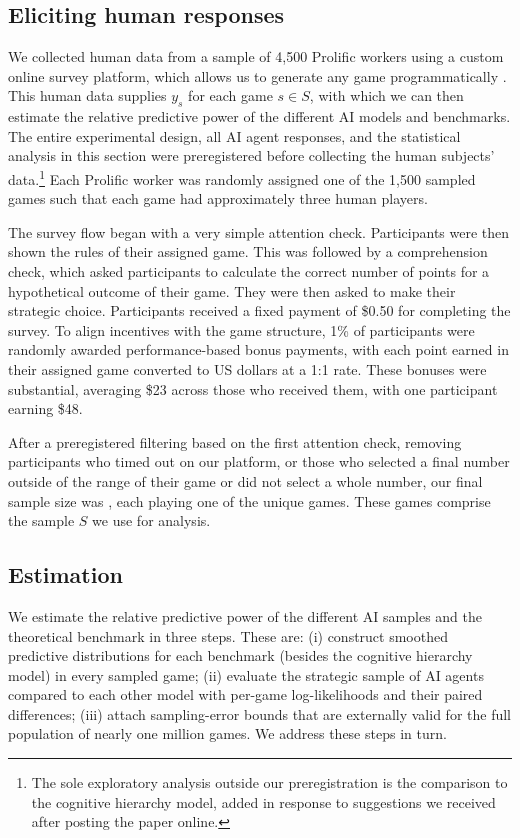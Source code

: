 \documentclass[11pt]{article}
\theoremstyle{definition}
\newcommand{\aisub}{AI agent}
\newcommand{\NGamesS}{1,500}
\newcommand{\NParticipantS}{4,500}
\begin{document}
\subsection{Eliciting human responses}

We collected human data from a sample of \NParticipantS{} Prolific workers using a custom online survey platform, which allows us to generate any game programmatically \citep{Horton2024EDSL}.
This human data supplies $y_{s}$ for each game $s \in S$, with which we can then estimate the relative predictive power of the different AI models and benchmarks.
The entire experimental design, all \aisub{} responses, and the statistical analysis in this section were preregistered before collecting the human subjects' data.\footnote{The sole exploratory analysis outside our preregistration is the comparison to the cognitive hierarchy model, added in response to suggestions we received after posting the paper online.}
Each Prolific worker was randomly assigned one of the \NGamesS{} sampled games such that each game had approximately three human players.

The survey flow began with a very simple attention check.
Participants were then shown the rules of their assigned game.
This was followed by a comprehension check, which asked participants to calculate the correct number of points for a hypothetical outcome of their game.
They were then asked to make their strategic choice.
Participants received a fixed payment of \$0.50 for completing the survey.
To align incentives with the game structure, 1\% of participants were randomly awarded performance-based bonus payments, with each point earned in their assigned game converted to US dollars at a 1:1 rate.
These bonuses were substantial, averaging \$23 across those who received them, with one participant earning \$48.

After a preregistered filtering based on the first attention check, removing participants who timed out on our platform, or those who selected a final number outside of the range of their game or did not select a whole number, our final sample size was \SampleSizeHuman{}, each playing one of the  \SampleSizeGame{} unique games.
These \SampleSizeGame{} games comprise the sample $S$ we use for analysis.

\subsection{Estimation}
\label{sec:estimation}

We estimate the relative predictive power of the different AI samples and the theoretical benchmark in three steps.
These are: (i) construct smoothed predictive distributions for each benchmark (besides the cognitive hierarchy model) in every sampled game; 
(ii) evaluate the strategic sample of \aisub{s} compared to each other model with per-game log-likelihoods and their paired differences;
(iii) attach sampling-error bounds that are externally valid for the full population of nearly one million games.
We address these steps in turn.
\end{document}
